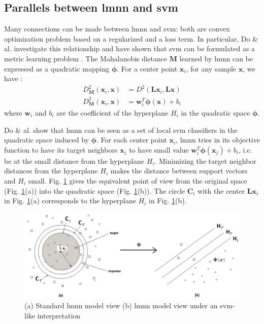 \subsection{Parallels between {\sc lmnn} and {\sc svm}}
\label{sec:LMNN_SVM}
Many connections can be made between {\sc lmnn} and {\sc svm}: both are convex optimization problem based on a regularized and a loss term. In particular, Do \& al. investigate this relationship and have shown that {\sc svm} can be formulated as a metric learning problem \cite{Do2012}. The Mahalanobis distance $\textbf{M}$ learned by {\sc lmnn} can be expressed as a quadratic mapping $\boldsymbol{\phi}$. For a center point $\textbf{x}_i$, for any sample $\textbf{x}$, we have \cite{Do2012}: 
\begin{align}
	D^2_\textbf{M}(\textbf{x}_i,\textbf{x}) & = D^2(\textbf{L} \textbf{x}_i,\textbf{L} \textbf{x}) \\
	D^2_\textbf{M}(\textbf{x}_i,\textbf{x}) & = \textbf{w}_i^T \boldsymbol{\phi}(\textbf{x}) + b_i
\end{align}	 
\noindent where $\textbf{w}_i$ and $b_i$ are the coefficient of the hyperplane $H_i$ in the quadratic space $\boldsymbol{\phi}$. 

Do \& al. show that {\sc lmnn} can be seen as a set of local {\sc svm} classifiers in the quadratic space induced by $\boldsymbol{\phi}$. For each center point $\textbf{x}_i$, {\sc lmnn} tries in its objective function to have its target neighbors $\textbf{x}_j$ to have small value $\textbf{w}_i^T \boldsymbol{\phi}(\textbf{x}_j) + b_i$, i.e. be at the small distance from the hyperplane $H_i$. Minimizing the target neighbor distances from the hyperplane $H_i$ makes the distance between support vectors and $H_i$ small. Fig. \ref{fig:RelationSVM_LMNN2} gives the equivalent point of view from the original space (Fig. \ref{fig:RelationSVM_LMNN2}(a)) into the quadratic space (Fig. \ref{fig:RelationSVM_LMNN2}(b)). The circle $\textbf{C}_i$ with the center $\textbf{L}\textbf{x}_i$ in Fig. \ref{fig:RelationSVM_LMNN2}(a) corresponds to the hyperplane $H_i$ in Fig. \ref{fig:RelationSVM_LMNN2}(b).

\begin{figure}[h!]
	\centering
	\includegraphics[width=1\linewidth]{images/RelationSVM_LMNN2}
	\caption{(a) Standard {\sc lmnn} model view (b) {\sc lmnn} model view under an {\sc svm}-like interpretation \cite{Do2012}}
	\label{fig:RelationSVM_LMNN2}
\end{figure}


